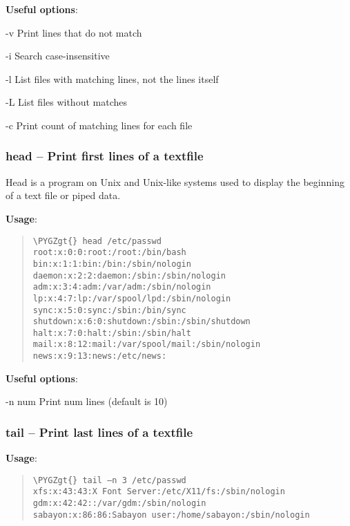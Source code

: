 \documentclass[a4paper,11pt,english]{sphinxmanual}
\def\PYGZgt{\char`\>}
\begin{document}
\textbf{Useful options}:
\begin{optionlist}{3cm}
\item [-v]  
Print lines that do not match
\item [-i]  
Search case-insensitive
\item [-l]  
List files with matching lines, not the lines itself
\item [-L]  
List files without matches
\item [-c]  
Print count of matching lines for each file
\end{optionlist}


\subsubsection{head – Print first lines of a textfile}
\label{introduction:head-print-first-lines-of-a-textfile}
Head is a program on Unix and Unix-like systems used to display the beginning of a text file or piped data.

\textbf{Usage}:  
\begin{quote}

\begin{Verbatim}[frame=single, rulecolor=\color{lightgray}, fontfamily=courier, commandchars=\\\{\}]
\PYGZgt{} head /etc/passwd
root:x:0:0:root:/root:/bin/bash
bin:x:1:1:bin:/bin:/sbin/nologin
daemon:x:2:2:daemon:/sbin:/sbin/nologin
adm:x:3:4:adm:/var/adm:/sbin/nologin
lp:x:4:7:lp:/var/spool/lpd:/sbin/nologin
sync:x:5:0:sync:/sbin:/bin/sync
shutdown:x:6:0:shutdown:/sbin:/sbin/shutdown
halt:x:7:0:halt:/sbin:/sbin/halt
mail:x:8:12:mail:/var/spool/mail:/sbin/nologin
news:x:9:13:news:/etc/news:
\end{Verbatim}
\end{quote}

\textbf{Useful options}:
\begin{optionlist}{3cm}
\item [-n num]  
Print num lines (default is 10)
\end{optionlist}


\subsubsection{tail – Print last lines of a textfile}
\label{introduction:tail-print-last-lines-of-a-textfile}
\textbf{Usage}:  
\begin{quote}

\begin{Verbatim}[frame=single, rulecolor=\color{lightgray}, fontfamily=courier, commandchars=\\\{\}]
\PYGZgt{} tail –n 3 /etc/passwd
xfs:x:43:43:X Font Server:/etc/X11/fs:/sbin/nologin
gdm:x:42:42::/var/gdm:/sbin/nologin
sabayon:x:86:86:Sabayon user:/home/sabayon:/sbin/nologin
\end{Verbatim}
\end{quote}
\end{document}
